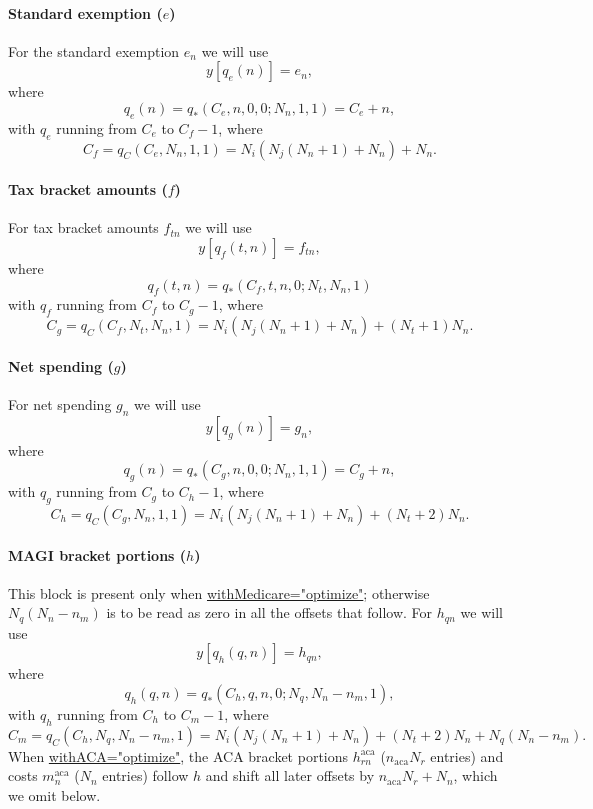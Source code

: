 \documentclass[fleqn,12pt]{report}
\newcommand{\code}[1]{\url{#1}}
\begin{document}
\paragraph*{Standard exemption (\boldmath$e$)}
For the standard exemption $e_n$ we will use
\begin{equation}
	y[q_e(n)] = e_{n},
\end{equation}
where
\begin{equation}
	q_e(n) = q_*(C_e, n, 0, 0; N_n, 1, 1) = C_e + n,
\end{equation}
with $q_e$ running from $C_e$ to $C_f - 1$, where
\[
	C_f = q_C(C_e, N_n, 1, 1) = N_i(N_j(N_n+1) + N_n) + N_n.
\]

\paragraph*{Tax bracket amounts (\boldmath$f$)}
For tax bracket amounts $f_{tn}$ we will use
\begin{equation}
	y[q_f(t, n)] = f_{tn},
\end{equation}
where
\begin{equation}
	q_f(t, n) = q_*(C_f, t, n, 0; N_t, N_n, 1)
\end{equation}
with $q_f$ running from $C_f$ to $C_g - 1$, where
\[
	C_g = q_C(C_f, N_t, N_n, 1) = N_i(N_j(N_n+1) + N_n) + (N_t + 1)N_n.
\]

\paragraph*{Net spending (\boldmath$g$)}
For net spending $g_{n}$ we will use
\begin{equation}
	y[q_g(n)] = g_{n},
\end{equation}
where
\begin{equation}
	q_g(n) = q_*(C_g, n, 0, 0; N_n, 1, 1) = C_g + n,
\end{equation}
with $q_g$ running from $C_g$ to $C_h - 1$, where
\[
	C_h = q_C(C_g, N_n, 1, 1) = N_i(N_j(N_n+1) + N_n) + (N_t + 2) N_n.
\]

\paragraph*{MAGI bracket portions (\boldmath$h$)}
This block is present only when \code{withMedicare="optimize"}; otherwise $N_q(N_n - n_m)$
is to be read as zero in all the offsets that follow.
For $h_{qn}$ we will use
\begin{equation}
	y[q_h(q, n)] = h_{qn},
\end{equation}
where
\begin{equation}
	q_h(q, n) = q_*(C_h, q, n, 0; N_q, N_n - n_m, 1),
\end{equation}
with $q_h$ running from $C_h$ to $C_m - 1$, where
\[
	C_m = q_C(C_h, N_q, N_n - n_m, 1)
	= N_i(N_j(N_n+1) + N_n) + (N_t + 2) N_n + N_q(N_n - n_m).
\]
When \code{withACA="optimize"}, the ACA bracket portions $h^{\mathrm{aca}}_{rn}$
($n_{\mathrm{aca}} N_r$ entries) and costs $m^{\mathrm{aca}}_n$ ($N_n$ entries)
follow $h$ and shift all later offsets by $n_{\mathrm{aca}}N_r + N_n$, which we omit below.
\end{document}
